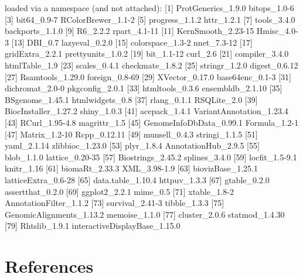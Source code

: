 \documentclass[12pt]{report}
\renewenvironment{Schunk}{\vspace{0pt}}{\vspace{0pt}}
\begin{document}
\begin{Schunk}
\begin{Soutput}
loaded via a namespace (and not attached):
 [1] ProtGenerics_1.9.0            bitops_1.0-6                 
 [3] bit64_0.9-7                   RColorBrewer_1.1-2           
 [5] progress_1.1.2                httr_1.2.1                   
 [7] tools_3.4.0                   backports_1.1.0              
 [9] R6_2.2.2                      rpart_4.1-11                 
[11] KernSmooth_2.23-15            Hmisc_4.0-3                  
[13] DBI_0.7                       lazyeval_0.2.0               
[15] colorspace_1.3-2              nnet_7.3-12                  
[17] gridExtra_2.2.1               prettyunits_1.0.2            
[19] bit_1.1-12                    curl_2.6                     
[21] compiler_3.4.0                htmlTable_1.9                
[23] scales_0.4.1                  checkmate_1.8.2              
[25] stringr_1.2.0                 digest_0.6.12                
[27] Rsamtools_1.29.0              foreign_0.8-69               
[29] XVector_0.17.0                base64enc_0.1-3              
[31] dichromat_2.0-0               pkgconfig_2.0.1              
[33] htmltools_0.3.6               ensembldb_2.1.10             
[35] BSgenome_1.45.1               htmlwidgets_0.8              
[37] rlang_0.1.1                   RSQLite_2.0                  
[39] BiocInstaller_1.27.2          shiny_1.0.3                  
[41] acepack_1.4.1                 VariantAnnotation_1.23.4     
[43] RCurl_1.95-4.8                magrittr_1.5                 
[45] GenomeInfoDbData_0.99.1       Formula_1.2-1                
[47] Matrix_1.2-10                 Rcpp_0.12.11                 
[49] munsell_0.4.3                 stringi_1.1.5                
[51] yaml_2.1.14                   zlibbioc_1.23.0              
[53] plyr_1.8.4                    AnnotationHub_2.9.5          
[55] blob_1.1.0                    lattice_0.20-35              
[57] Biostrings_2.45.2             splines_3.4.0                
[59] locfit_1.5-9.1                knitr_1.16                   
[61] biomaRt_2.33.3                XML_3.98-1.9                 
[63] biovizBase_1.25.1             latticeExtra_0.6-28          
[65] data.table_1.10.4             httpuv_1.3.3                 
[67] gtable_0.2.0                  assertthat_0.2.0             
[69] ggplot2_2.2.1                 mime_0.5                     
[71] xtable_1.8-2                  AnnotationFilter_1.1.2       
[73] survival_2.41-3               tibble_1.3.3                 
[75] GenomicAlignments_1.13.2      memoise_1.1.0                
[77] cluster_2.0.6                 statmod_1.4.30               
[79] Rhtslib_1.9.1                 interactiveDisplayBase_1.15.0
\end{Soutput}
\end{Schunk}

\section{References}



\end{document}
